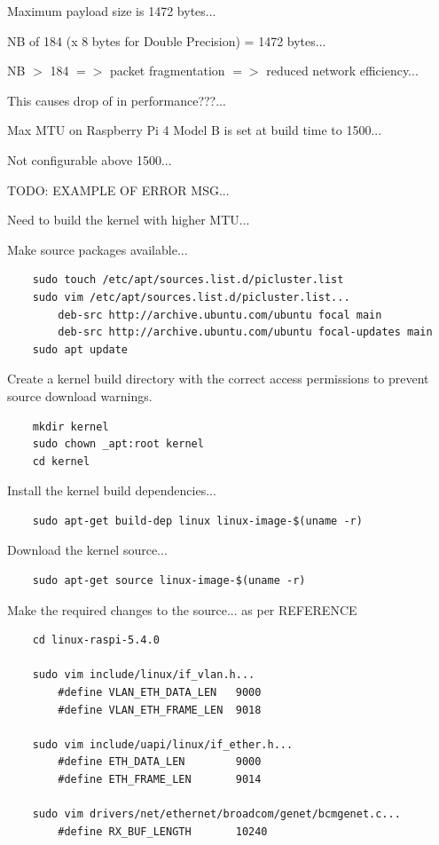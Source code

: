 \documentclass{article}
\begin{document}
Maximum payload size is 1472 bytes...

NB of 184 (x 8 bytes for Double Precision) = 1472 bytes...

NB $>$ 184 $=>$ packet fragmentation $=>$ reduced network efficiency...

This causes drop of in performance???...

Max MTU on Raspberry Pi 4 Model B is set at build time to 1500...

Not configurable above 1500...

TODO: EXAMPLE OF ERROR MSG...

Need to build the kernel with higher MTU...


Make source packages available...

\begin{verbatim}
    sudo touch /etc/apt/sources.list.d/picluster.list
    sudo vim /etc/apt/sources.list.d/picluster.list...
        deb-src http://archive.ubuntu.com/ubuntu focal main
        deb-src http://archive.ubuntu.com/ubuntu focal-updates main
    sudo apt update
\end{verbatim}

Create a kernel build directory with the correct access permissions to prevent source download warnings. 

\begin{verbatim}
    mkdir kernel
    sudo chown _apt:root kernel
    cd kernel
\end{verbatim}

Install the kernel build dependencies...

\begin{verbatim}
    sudo apt-get build-dep linux linux-image-$(uname -r)
\end{verbatim}

Download the kernel source...

\begin{verbatim}
    sudo apt-get source linux-image-$(uname -r)
\end{verbatim}

Make the required changes to the source... as per REFERENCE

\begin{verbatim}
    cd linux-raspi-5.4.0 

    sudo vim include/linux/if_vlan.h...
        #define VLAN_ETH_DATA_LEN   9000
        #define VLAN_ETH_FRAME_LEN  9018
    
    sudo vim include/uapi/linux/if_ether.h...
        #define ETH_DATA_LEN        9000
        #define ETH_FRAME_LEN       9014
    
    sudo vim drivers/net/ethernet/broadcom/genet/bcmgenet.c...
        #define RX_BUF_LENGTH       10240
\end{verbatim}
\end{document}
